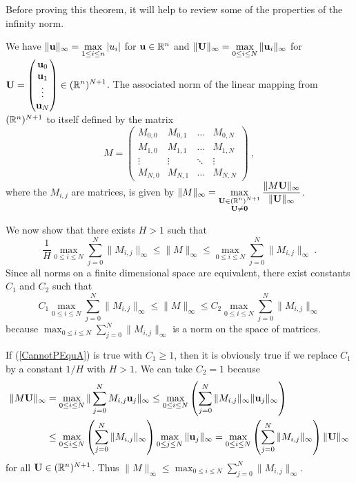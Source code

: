 \begin{rmk}
Before proving this theorem, it will help to
review some of the properties of the infinity norm.

We have $\displaystyle \|\mathbf{u} \|_\infty = \max_{1 \leq i \leq n} |u_i|$ for
$\mathbf{u}\in \mathbb{R}^n$ and
$\displaystyle \|\mathbf{U}\|_\infty = \max_{0 \leq i \leq N} \| \mathbf{u}_i \|_\infty$
for 
$\displaystyle \mathbf{U} = \begin{pmatrix}
\mathbf{u}_0 \\ \mathbf{u}_1 \\ \vdots \\ \mathbf{u}_N \end{pmatrix}
\in (\mathbb{R}^n)^{N+1}$.  The associated norm of the linear mapping
from $(\mathbb{R}^n)^{N+1}$ to itself defined by the matrix
\[
M = \begin{pmatrix}
M_{0,0} & M_{0,1} & \ldots & M_{0,N} \\
M_{1,0} & M_{1,1} & \ldots & M_{1,N} \\
 \vdots & \vdots & \ddots & \vdots \\
M_{N,0} & M_{N,1} & \ldots & M_{N,N}
\end{pmatrix} \ ,
\]
where the $M_{i,j}$ are \nn matrices, is given by
$\displaystyle \| M \|_\infty = \max_{\substack{\mathbf{U} \in (\mathbb{R}^n)^{N+1}\\
\mathbf{U} \neq \mathbf{0}}}
\frac{\|M \mathbf{U}\|_\infty}{\|\mathbf{U}\|_\infty}$.

We now show that there exists $H>1$ such that
\begin{equation} \label{CannotPEqu}
\frac{1}{H}  \max_{0\leq i \leq N} \sum_{j=0}^N \|M_{i,j}\|_\infty
\leq \| M \|_\infty \leq \max_{0\leq i \leq N}
\sum_{j=0}^N \|M_{i,j}\|_\infty \ .
\end{equation}
Since all norms on a finite dimensional space are
equivalent, there exist constants $C_1$ and $C_2$ such that
\begin{equation} \label{CannotPEquA}
C_1 \max_{0\leq i \leq N} \sum_{j=0}^N \|M_{i,j}\|_\infty
\leq \| M \|_\infty \leq C_2 \max_{0\leq i \leq N} \sum_{j=0}^N
\|M_{i,j}\|_\infty
\end{equation}
because
$\displaystyle \max_{0\leq i \leq N} \sum_{j=0}^N \|M_{i,j}\|_\infty$
is a norm on the space of  matrices.

If (\ref{CannotPEquA}) is true with $C_1 \geq 1$, then it is obviously
true if we replace $C_1$ by a constant $1/H$ with $H>1$.
We can take $C_2 = 1$ because
\begin{align*}
\| M \mathbf{U} \|_\infty
&= \max_{0 \leq i \leq N} \| \sum_{j=0}^N M_{i,j} \mathbf{u}_j \|_\infty
\leq \max_{0\leq i \leq N} \left( \sum_{j=0}^N \| M_{i,j}\|_\infty
\| \mathbf{u}_j \|_\infty \right) \\
&\leq \max_{0\leq i \leq N} \left( \sum_{j=0}^N \| M_{i,j}\|_\infty \right)
\max_{0 \leq j \leq N} \| \mathbf{u}_j \|_\infty
= \max_{0\leq i \leq N} \left( \sum_{j=0}^N \| M_{i,j} \|_\infty \right)
\| \mathbf{U} \|_\infty
\end{align*}
for all $\mathbf{U} \in (\mathbb{R}^n)^{N+1}$.  Thus
$\displaystyle \| M \|_\infty \leq
\max_{0\leq i \leq N} \sum_{j=0}^N \|M_{i,j}\|_\infty$.
\label{FDMrmkNorm}
\end{rmk}


